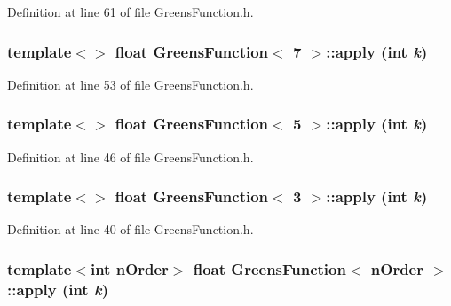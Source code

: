 Definition at line 61 of file GreensFunction.h.

\subsubsection[{apply}]{\setlength{\rightskip}{0pt plus 5cm}template$<$$>$ float {\bf GreensFunction}$<$ 7 $>$::apply (int {\em k})}\label{classGreensFunction_a3f675ed09bff6149f83a7ca6c2eb48f1}


Definition at line 53 of file GreensFunction.h.

\subsubsection[{apply}]{\setlength{\rightskip}{0pt plus 5cm}template$<$$>$ float {\bf GreensFunction}$<$ 5 $>$::apply (int {\em k})}\label{classGreensFunction_a8deeec4645b23ce64dfcf92fde4ace48}


Definition at line 46 of file GreensFunction.h.

\subsubsection[{apply}]{\setlength{\rightskip}{0pt plus 5cm}template$<$$>$ float {\bf GreensFunction}$<$ 3 $>$::apply (int {\em k})}\label{classGreensFunction_a8550135a0b0bdbd22042766daa7d0e91}


Definition at line 40 of file GreensFunction.h.

\subsubsection[{apply}]{\setlength{\rightskip}{0pt plus 5cm}template$<$int nOrder$>$ float {\bf GreensFunction}$<$ nOrder $>$::apply (int {\em k})}\label{classGreensFunction_a1440d9f402b491517bbeae7b0b185efb}


